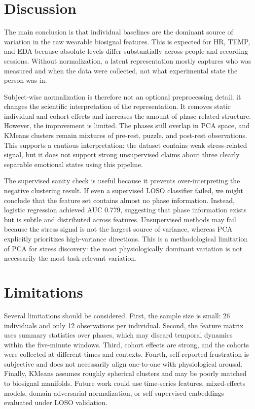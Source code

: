 \documentclass{article}
\begin{document}
\section*{Discussion}
The main conclusion is that individual baselines are the dominant source of variation in the raw wearable biosignal features. This is expected for HR, TEMP, and EDA because absolute levels differ substantially across people and recording sessions. Without normalization, a latent representation mostly captures who was measured and when the data were collected, not what experimental state the person was in.

Subject-wise normalization is therefore not an optional preprocessing detail; it changes the scientific interpretation of the representation. It removes static individual and cohort effects and increases the amount of phase-related structure. However, the improvement is limited. The phases still overlap in PCA space, and KMeans clusters remain mixtures of pre-rest, puzzle, and post-rest observations. This supports a cautious interpretation: the dataset contains weak stress-related signal, but it does not support strong unsupervised claims about three clearly separable emotional states using this pipeline.

The supervised sanity check is useful because it prevents over-interpreting the negative clustering result. If even a supervised LOSO classifier failed, we might conclude that the feature set contains almost no phase information. Instead, logistic regression achieved AUC 0.779, suggesting that phase information exists but is subtle and distributed across features. Unsupervised methods may fail because the stress signal is not the largest source of variance, whereas PCA explicitly prioritizes high-variance directions. This is a methodological limitation of PCA for stress discovery: the most physiologically dominant variation is not necessarily the most task-relevant variation.

\section*{Limitations}
Several limitations should be considered. First, the sample size is small: 26 individuals and only 12 observations per individual. Second, the feature matrix uses summary statistics over phases, which may discard temporal dynamics within the five-minute windows. Third, cohort effects are strong, and the cohorts were collected at different times and contexts. Fourth, self-reported frustration is subjective and does not necessarily align one-to-one with physiological arousal. Finally, KMeans assumes roughly spherical clusters and may be poorly matched to biosignal manifolds. Future work could use time-series features, mixed-effects models, domain-adversarial normalization, or self-supervised embeddings evaluated under LOSO validation.
\end{document}
